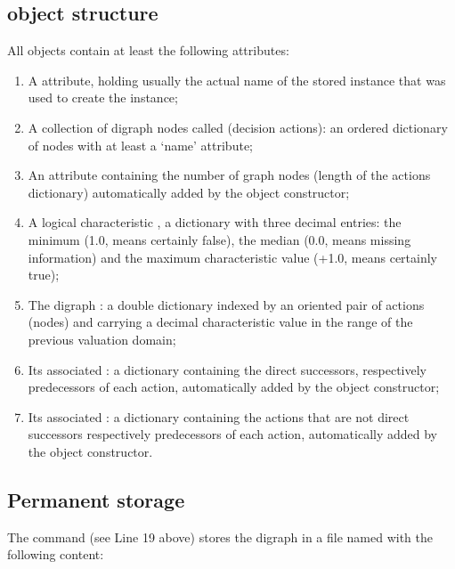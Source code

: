 \documentclass[a4paper,10pt,english]{sphinxhowto}
\begin{document}
\subsection{ object structure}
\label{\detokenize{tutorial:digraph-object-structure}}
All  objects contain at least the following attributes:
\begin{enumerate}
%
\setcounter{enumi}{-1}
\item {} 
A  attribute, holding usually the actual name of the stored instance that was used to create the instance;

\item {} 
A collection of digraph nodes called  (decision actions): an ordered dictionary of nodes with at least a ‘name’ attribute;

\item {} 
An  attribute containing the number of graph nodes (length of the actions dictionary) automatically added by the object constructor;

\item {} 
A logical characteristic , a dictionary with three decimal entries: the minimum (\sphinxhyphen{}1.0, means certainly false), the median (0.0, means missing information) and the maximum characteristic value (+1.0, means certainly true);

\item {} 
The digraph  : a double dictionary indexed by an oriented pair of actions (nodes) and carrying a decimal characteristic value in the range of the previous valuation domain;

\item {} 
Its associated  : a dictionary containing the direct successors, respectively predecessors of each action, automatically added by the object constructor;

\item {} 
Its associated  : a dictionary containing the actions that are not direct successors respectively predecessors of each action, automatically added by the object constructor.

\end{enumerate}


\subsection{Permanent storage}
\label{\detokenize{tutorial:permanent-storage}}
The  command (see Line 19 above) stores the digraph  in a file named  with the following content:
\end{document}

